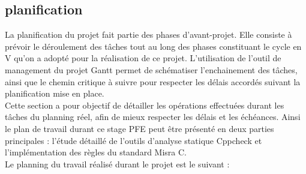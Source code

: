 \subsection{planification}
La planification du projet fait partie des phases d’avant-projet. Elle consiste à prévoir le déroulement des tâches tout au long des phases constituant le cycle en V qu’on a adopté pour la réalisation de ce projet.
L’utilisation de l’outil de management du projet Gantt permet de schématiser l’enchainement des tâches, ainsi que le chemin critique à suivre pour respecter les délais accordés suivant la planification mise en place.\\
Cette section a pour objectif de détailler les opérations effectuées durant les tâches du planning réel, afin de mieux respecter les délais et les échéances. Ainsi le plan de travail durant ce stage PFE peut être présenté en deux parties principales : l’étude détaillé de l’outils d’analyse statique Cppcheck et l’implémentation des règles du standard Misra C.\\
Le planning du travail réalisé durant le projet est le suivant :



